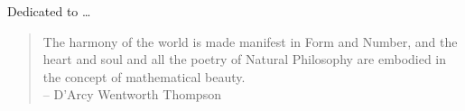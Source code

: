 \thispagestyle{empty}

\begin{center}
\noindent

\null%
\vfill

\flushright Dedicated to \ldots

\null%
\vfill

\begin{quote}
	The harmony of the world is made manifest in Form and Number, and 
	the heart and soul and all the poetry of Natural Philosophy are 
	embodied in the concept of mathematical beauty.\\
	\flushright -- D'Arcy Wentworth Thompson
\end{quote}

\end{center}
